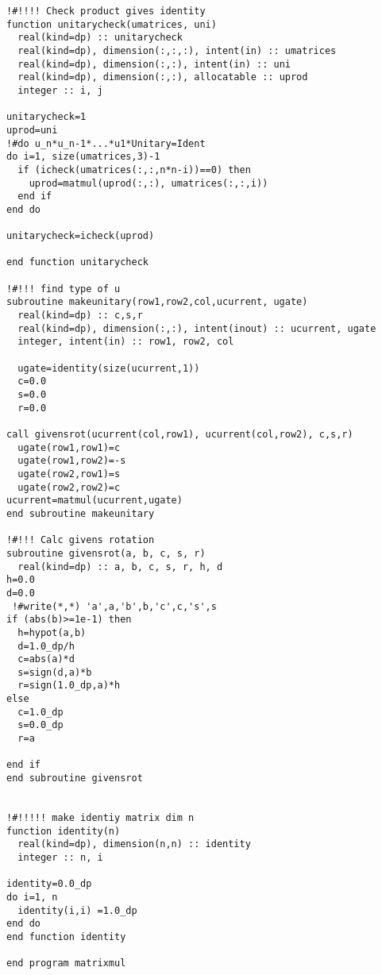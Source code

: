 \begin{verbatim}
!#!!!! Check product gives identity 
function unitarycheck(umatrices, uni)
  real(kind=dp) :: unitarycheck
  real(kind=dp), dimension(:,:,:), intent(in) :: umatrices
  real(kind=dp), dimension(:,:), intent(in) :: uni
  real(kind=dp), dimension(:,:), allocatable :: uprod
  integer :: i, j

unitarycheck=1
uprod=uni
!#do u_n*u_n-1*...*u1*Unitary=Ident
do i=1, size(umatrices,3)-1
  if (icheck(umatrices(:,:,n*n-i))==0) then
    uprod=matmul(uprod(:,:), umatrices(:,:,i))
  end if
end do

unitarycheck=icheck(uprod)

end function unitarycheck 

!#!!! find type of u
subroutine makeunitary(row1,row2,col,ucurrent, ugate)
  real(kind=dp) :: c,s,r
  real(kind=dp), dimension(:,:), intent(inout) :: ucurrent, ugate
  integer, intent(in) :: row1, row2, col
  
  ugate=identity(size(ucurrent,1))
  c=0.0
  s=0.0
  r=0.0

call givensrot(ucurrent(col,row1), ucurrent(col,row2), c,s,r)
  ugate(row1,row1)=c
  ugate(row1,row2)=-s
  ugate(row2,row1)=s
  ugate(row2,row2)=c
ucurrent=matmul(ucurrent,ugate)
end subroutine makeunitary

!#!!! Calc givens rotation
subroutine givensrot(a, b, c, s, r)
  real(kind=dp) :: a, b, c, s, r, h, d
h=0.0
d=0.0
 !#write(*,*) 'a',a,'b',b,'c',c,'s',s
if (abs(b)>=1e-1) then
  h=hypot(a,b)
  d=1.0_dp/h
  c=abs(a)*d
  s=sign(d,a)*b
  r=sign(1.0_dp,a)*h
else
  c=1.0_dp
  s=0.0_dp
  r=a
  
end if
end subroutine givensrot  


!#!!!!! make identiy matrix dim n
function identity(n)
  real(kind=dp), dimension(n,n) :: identity
  integer :: n, i

identity=0.0_dp
do i=1, n
  identity(i,i) =1.0_dp
end do
end function identity

end program matrixmul

\end{verbatim}